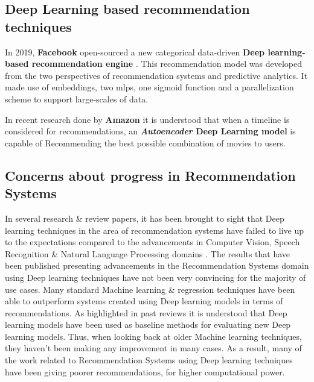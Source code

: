 \subsection{Deep Learning based recommendation techniques}
In 2019, \textbf{Facebook} open-sourced a new categorical data-driven \textbf{Deep learning-based recommendation engine} \autocite{naumov_deep_2019, noauthor_we_2019}. This recommendation model was developed from the two perspectives of recommendation systems and predictive analytics. It made use of embeddings, two \gls{mlp}s, one sigmoid function \autocite{freudenthaler_factorization_2011} and a parallelization scheme to support large-scales of data.

In recent research done by \textbf{Amazon} \autocite{larry_history_2019} it is understood that when a timeline is considered for recommendations, an \textbf{\emph{Autoencoder} Deep Learning model} is capable of Recommending the best possible combination of movies to users.



\subsection{Concerns about progress in Recommendation Systems}
In several research \& review papers, it has been brought to sight that Deep learning techniques in the area of recommendation systems have failed to live up to the expectations compared to the advancements in Computer Vision, Speech Recognition \& Natural Language Processing domains \autocite{choi_local_2021}. The results that have been published presenting advancements in the Recommendation Systems domain using Deep learning techniques have not been very convincing for the majority of use cases. Many standard Machine learning \& regression techniques have been able to outperform systems created using Deep learning models in terms of recommendations. As highlighted in past reviews \autocite{dacrema_are_2019} it is understood that Deep learning models have been used as baseline methods for evaluating new Deep learning models. Thus, when looking back at older Machine learning techniques, they haven't been making any improvement in many cases. As a result, many of the work related to Recommendation Systems using Deep learning techniques have been giving poorer recommendations, for higher computational power.



